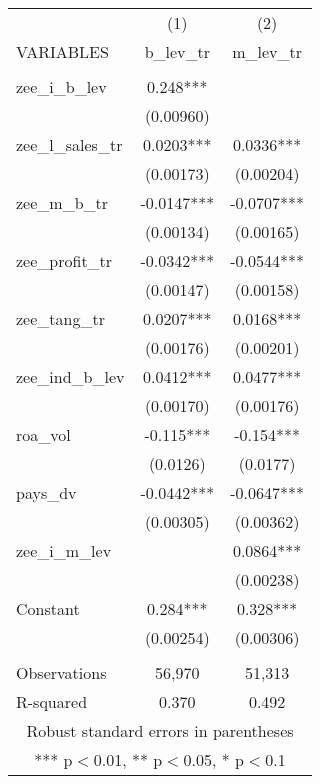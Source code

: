 \begin{tabular}{lcc} \hline
 & (1) & (2) \\
VARIABLES & b\_lev\_tr & m\_lev\_tr \\ \hline
 &  &  \\
zee\_i\_b\_lev & 0.248*** &  \\
 & (0.00960) &  \\
zee\_l\_sales\_tr & 0.0203*** & 0.0336*** \\
 & (0.00173) & (0.00204) \\
zee\_m\_b\_tr & -0.0147*** & -0.0707*** \\
 & (0.00134) & (0.00165) \\
zee\_profit\_tr & -0.0342*** & -0.0544*** \\
 & (0.00147) & (0.00158) \\
zee\_tang\_tr & 0.0207*** & 0.0168*** \\
 & (0.00176) & (0.00201) \\
zee\_ind\_b\_lev & 0.0412*** & 0.0477*** \\
 & (0.00170) & (0.00176) \\
roa\_vol & -0.115*** & -0.154*** \\
 & (0.0126) & (0.0177) \\
pays\_dv & -0.0442*** & -0.0647*** \\
 & (0.00305) & (0.00362) \\
zee\_i\_m\_lev &  & 0.0864*** \\
 &  & (0.00238) \\
Constant & 0.284*** & 0.328*** \\
 & (0.00254) & (0.00306) \\
 &  &  \\
Observations & 56,970 & 51,313 \\
 R-squared & 0.370 & 0.492 \\ \hline
\multicolumn{3}{c}{ Robust standard errors in parentheses} \\
\multicolumn{3}{c}{ *** p$<$0.01, ** p$<$0.05, * p$<$0.1} \\
\end{tabular}
